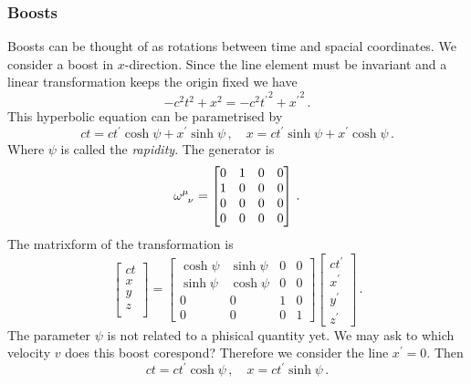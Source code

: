 \subsubsection*{Boosts}
Boosts can be thought of as rotations between time and spacial coordinates. We
consider a boost in $x$-direction. Since the line element must be invariant and
a linear transformation keeps the origin fixed we have
\begin{equation}
  -c^2t^2+x^2=-c^2{t^\prime}^2+{x^\prime}^2\, .
  \end{equation}
  This hyperbolic equation can be parametrised by
  \begin{equation}
  ct = ct^\prime\cosh\psi+x^\prime\sinh\psi\,, \quad x =
  ct^\prime\sinh\psi+x^\prime\cosh\psi\, .
  \end{equation}
  Where $\psi$ is called the \emph{rapidity}. 
  The generator is 
  \begin{equation}
  \tensor{\omega}{^\mu_\nu}
  =\begin{bmatrix}
  0&1 & 0&0\\
  1&0 &0&0\\
  0&0&0 &0\\
  0&0 &0 &0
  \end{bmatrix}\,.
  \end{equation}
  The matrixform of the transformation is
  \begin{equation}
  \begin{bmatrix}
  ct\\
  x\\
  y\\
  z\\
  \end{bmatrix}=
  \begin{bmatrix}
  \cosh\psi&\sinh\psi & 0&0\\
  \sinh\psi&\cosh\psi &0&0\\
  0&0&1 &0\\
  0&0 &0 &1
  \end{bmatrix}
  \begin{bmatrix}
  ct^\prime\\
  x^\prime\\
  y^\prime\\
  z^\prime
  \end{bmatrix}\, .
  \end{equation}
  The parameter $\psi$ is not related to a phisical quantity yet. We may ask to which 
  velocity $v$ does this boost corespond? 
  Therefore we consider the line $x^\prime= 0$.
  Then
  \begin{equation}
  ct=ct^\prime\cosh\psi\, ,\quad
  x=ct^\prime\sinh\psi\, .
  \end{equation}
